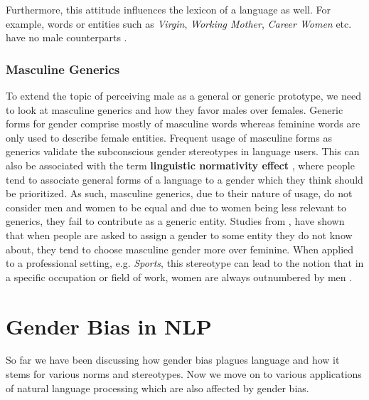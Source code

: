 \documentclass{article}
\begin{document}
\noindent
Furthermore, this attitude influences the lexicon of a language as well. For example, words or entities such as \textit{Virgin}, \textit{Working Mother}, \textit{Career Women} etc. have no male counterparts \cite{budziszewska2014men} \cite{maass1996language}.

\subsubsection*{Masculine Generics}
To extend the topic of perceiving male as a general or generic prototype, we need to look at masculine generics and how they favor males over females. Generic forms for gender comprise mostly of masculine words whereas feminine words are only used to describe female entities. Frequent usage of masculine forms as generics validate the subconscious  gender stereotypes in language users. This can also be associated with the term \textbf{linguistic normativity effect} \cite{menegatti2017gender}, where people tend to associate general forms of a language to a gender which they think should be prioritized. As such, masculine generics, due to their nature of usage, do not consider men and women to be equal and due to women being less relevant to generics, they fail to contribute as a generic entity. Studies from \cite{braun2005cognitive}, \cite{sczesny2016can} have shown that when people are asked to assign a gender to some entity they do not know about, they tend to choose masculine gender more over feminine. When applied to a professional setting, e.g. \textit{Sports}, this stereotype can lead to the notion that in a specific occupation or field of work, women are always outnumbered by men \cite{stahlberg2007representation}. 


\section*{Gender Bias in NLP}
So far we have been discussing how gender bias plagues language and how it stems for various norms and stereotypes. Now we move on to various applications of natural language processing which are also affected by gender bias. 
\end{document}
